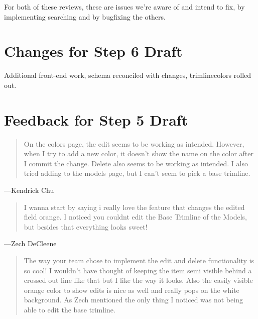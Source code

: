 \documentclass[11pt,letterpaper,oneside]{amsart}
\begin{document}
For both of these reviews, these are issues we're aware of and intend to fix, by implementing searching and by bugfixing the others.

\section*{Changes for Step 6 Draft}

Additional front-end work, schema reconciled with changes, trimline\textunderscore colors rolled out.

\section*{Feedback for Step 5 Draft}

\begin{tcolorbox} \begin{quotation}
On the colors page, the edit seems to be working as intended.  However, when I try to add a new color, it doesn't show the name on the color after I commit the change.  Delete also seems to be working as intended.  I also tried adding to the models page, but I can't seem to pick a base trimline.
\end{quotation} \end{tcolorbox}

---Kendrick Chu

\begin{tcolorbox} \begin{quotation}
I wanna start by saying i really love the feature that changes the edited field orange. I noticed you couldnt edit the Base Trimline of the Models, but besides that everything looks sweet!
\end{quotation} \end{tcolorbox}

---Zech DeCleene

\begin{tcolorbox} \begin{quotation}
The way your team chose to implement the edit and delete functionality is so cool! I wouldn't have thought of keeping the item semi visible behind a crossed out line like that but I like the way it looks. Also the easily visible orange color to show edits is nice as well and really pops on the white background. As Zech mentioned the only thing I noticed was not being able to edit the base trimline.
\end{quotation} \end{tcolorbox}
\end{document}
